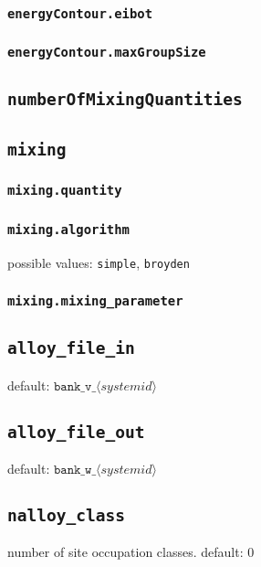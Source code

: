 \subsubsection{\texttt{energyContour.eibot}}

\subsubsection{\texttt{energyContour.maxGroupSize}}

\subsection{\texttt{numberOfMixingQuantities}}

\subsection{\texttt{mixing}}

\subsubsection{\texttt{mixing.quantity}}

\subsubsection{\texttt{mixing.algorithm}}
possible values: \texttt{simple}, \texttt{broyden}

\subsubsection{\texttt{mixing.mixing\_parameter}}


\subsection{\texttt{alloy\_file\_in}}
default: $\texttt{bank\_v\_}\langle\textit{systemid}\rangle$

\subsection{\texttt{alloy\_file\_out}}
default: $\texttt{bank\_w\_}\langle\textit{systemid}\rangle$

\subsection{\texttt{nalloy\_class}}
number of site occupation classes.
default: 0

